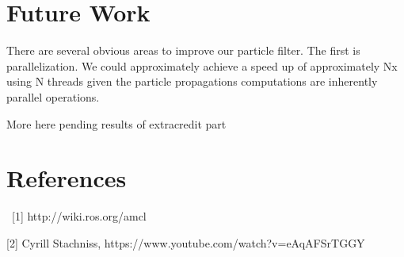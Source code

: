 \documentclass{article}
\begin{document}
\section{Future Work}

There are several obvious areas to improve our particle filter.  The first is parallelization. We could approximately achieve a speed up of approximately Nx using N threads given the particle propagations computations are inherently parallel operations.

More here pending results of extracredit part

\section{References}\
[1] http://wiki.ros.org/amcl 

[2] Cyrill Stachniss,  https://www.youtube.com/watch?v=eAqAFSrTGGY
\end{document}
